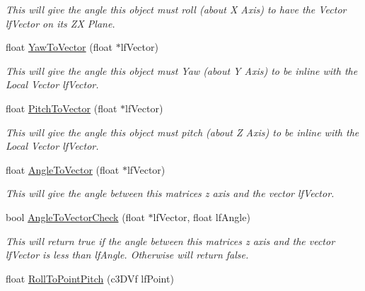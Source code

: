 \begin{DoxyCompactItemize}
\begin{DoxyCompactList}\small\item\em This will give the angle this object must roll (about X Axis) to have the Vector lfVector on its ZX Plane. \end{DoxyCompactList}\item 
\hypertarget{classc_matrix4_a579148ed3a89f6a02c8487339b64e4e7}{
float \hyperlink{classc_matrix4_a579148ed3a89f6a02c8487339b64e4e7}{YawToVector} (float $\ast$lfVector)}
\label{classc_matrix4_a579148ed3a89f6a02c8487339b64e4e7}

\begin{DoxyCompactList}\small\item\em This will give the angle this object must Yaw (about Y Axis) to be inline with the Local Vector lfVector. \end{DoxyCompactList}\item 
\hypertarget{classc_matrix4_a15b8a8f655f63c36fd3070e7c964b873}{
float \hyperlink{classc_matrix4_a15b8a8f655f63c36fd3070e7c964b873}{PitchToVector} (float $\ast$lfVector)}
\label{classc_matrix4_a15b8a8f655f63c36fd3070e7c964b873}

\begin{DoxyCompactList}\small\item\em This will give the angle this object must pitch (about Z Axis) to be inline with the Local Vector lfVector. \end{DoxyCompactList}\item 
\hypertarget{classc_matrix4_a62ae3bdd1675684e4b75e92d0eb64d38}{
float \hyperlink{classc_matrix4_a62ae3bdd1675684e4b75e92d0eb64d38}{AngleToVector} (float $\ast$lfVector)}
\label{classc_matrix4_a62ae3bdd1675684e4b75e92d0eb64d38}

\begin{DoxyCompactList}\small\item\em This will give the angle between this matrices z axis and the vector lfVector. \end{DoxyCompactList}\item 
\hypertarget{classc_matrix4_a07ec35f3954c866a88cd842acb463656}{
bool \hyperlink{classc_matrix4_a07ec35f3954c866a88cd842acb463656}{AngleToVectorCheck} (float $\ast$lfVector, float lfAngle)}
\label{classc_matrix4_a07ec35f3954c866a88cd842acb463656}

\begin{DoxyCompactList}\small\item\em This will return true if the angle between this matrices z axis and the vector lfVector is less than lfAngle. Otherwise will return false. \end{DoxyCompactList}\item 
\hypertarget{classc_matrix4_ac228aef3d8a951ba471c33255c5c5986}{
float \hyperlink{classc_matrix4_ac228aef3d8a951ba471c33255c5c5986}{RollToPointPitch} (c3DVf lfPoint)}
\label{classc_matrix4_ac228aef3d8a951ba471c33255c5c5986}


\end{DoxyCompactItemize}
